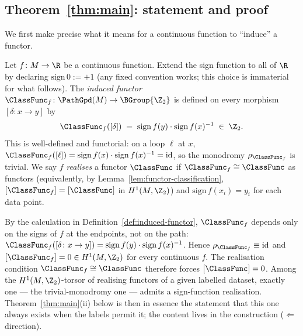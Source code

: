 \subsection{Theorem~\ref{thm:main}: statement and proof}\label{ssec:thm-main}

We first make precise what it means for a continuous function to
``induce'' a functor.

\begin{definition}\label{def:induced-functor}
Let $f\colon M\to\R$ be a continuous function. Extend the sign
function to all of $\R$ by declaring $\mathrm{sign}\,0 := +1$ (any
fixed convention works; this choice is immaterial for what follows).
The \emph{induced functor}
$\ClassFunc_f\colon\PathGpd(M)\to\BGroup{\Z_2}$ is defined on every
morphism $[\delta\colon x\to y]$ by
\[
   \ClassFunc_f([\delta]) \;=\;
   \mathrm{sign}\,f(y)\cdot \mathrm{sign}\,f(x)^{-1} \;\in\;\Z_2.
\]
This is well-defined and functorial: on a loop $\ell$ at $x$,
$\ClassFunc_f([\ell])=
\mathrm{sign}\,f(x)\cdot\mathrm{sign}\,f(x)^{-1}=\mathrm{id}$, so the
monodromy $\rho_{\ClassFunc_f}$ is trivial. We say $f$
\emph{realises} a functor $\ClassFunc$ if $\ClassFunc_f\cong
\ClassFunc$ as functors (equivalently, by
Lemma~\ref{lem:functor-classification},
$[\ClassFunc_f]=[\ClassFunc]$ in $H^1(M,\Z_2)$) and
$\mathrm{sign}\,f(x_i)=y_i$ for each data point.
\end{definition}

\begin{remark}\label{rem:induced-trivial}
By the calculation in Definition~\ref{def:induced-functor},
$\ClassFunc_f$ depends only on the signs of $f$ at the endpoints, not
on the path: $\ClassFunc_f([\delta\colon x\to y])=\mathrm{sign}\,f(y)
\cdot\mathrm{sign}\,f(x)^{-1}$. Hence $\rho_{\ClassFunc_f}\equiv
\mathrm{id}$ and $[\ClassFunc_f]=0\in H^1(M,\Z_2)$ for every
continuous $f$. The realisation condition $\ClassFunc_f\cong
\ClassFunc$ therefore forces $[\ClassFunc]=0$. Among the
$H^1(M,\Z_2)$-torsor of realising functors of a given labelled
dataset, exactly one --- the trivial-monodromy one --- admits a
sign-function realisation. Theorem~\ref{thm:main}(ii) below is then
in essence the statement that this one always exists when the labels
permit it; the content lives in the construction
($\Leftarrow$ direction).
\end{remark}

